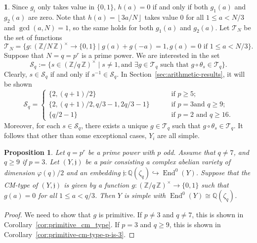 \documentclass{amsart}[11pt]
\newtheorem{prop}[thm]{Proposition}
\theoremstyle{definition}
\newtheorem{sect}[thm]{}
\numberwithin{equation}{section}
\theoremstyle{notitle}
\begin{document}
  \begin{sect}\label{subsec:notation-arithmetic-result-on-cm-type}
    Since $g_i$ only takes value in $\{0,1\}$, $h(a)=0$ if and only if
    both $g_1(a)$ and $g_2(a)$ are zero. Note that $h(a)={\left\lfloor {3a/N} \right\rfloor}$
    takes value 0 for all $1\leq a< N/3$ and $\gcd(a,N)=1$, so the
    same holds for both $g_1(a)$ and $g_2(a)$.  Let ${\mathscr{T}}_N$ be the set
    of functions
  \begin{equation}
    \label{eq:35}
    {\mathscr{T}}_N=\{g: {(\mathbb{Z}/ {N}\, \mathbb{Z})^\times}\to \{0, 1\}\mid g(a)+g(-a)=1,  g(a)=0 \text{ if }
    1\leq a <N/3\}.
  \end{equation}
  Suppose that $N=q=p^r$ is a prime power. We are interested in the
  set 
  \begin{equation}
    \label{eq:37}
 {\mathscr{S}}_q:=\{s\in {(\mathbb{Z}/ {q}\, \mathbb{Z})^\times} \mid s\neq 1, \text{and } \exists g\in
  {\mathscr{T}}_q \text{ such that } g\circ \theta_s\in {\mathscr{T}}_q\}.     
  \end{equation}
Clearly, $s\in {\mathscr{S}}_q$ if and only if $s^{-1}\in {\mathscr{S}}_q$. 
  In Section~\ref{sec:arithmetic-results}, it will be shown
  \begin{equation}
    \label{eq:36}
    {\mathscr{S}}_q=
    \begin{cases}
      \{2, (q+1)/2\}  \qquad & \text{ if } p \geq 5;\\
      \{2, (q+1)/2, q/3-1, 2q/3-1\} \qquad & \text{ if } p=3 \text{
        and } q\geq 9;\\
      \{q/2-1\} \qquad & \text{ if } p=2 \text{ and } q\geq 16. 
    \end{cases}
  \end{equation}
  Moreover, for each $s\in {\mathscr{S}}_q$, there exists a unique $g\in {\mathscr{T}}_q$
  such that $g\circ \theta_s\in {\mathscr{T}}_q$. It follows that other than
  some exceptional cases, $Y_i$ are all simple. 
  \end{sect}

\begin{prop}\label{prop:simple-cm-by-cyclotomic}
  Let $q=p^r$ be a prime power with $p$ odd. Assume that $q\neq 7$,
  and $q\geq 9$ if $p=3$. Let $(Y,{\mathfrak{j}})$ be a pair consisting a complex
  abelian variety of dimension $\varphi(q)/2$ and an embedding ${\mathfrak{j}}:
  {\mathbb{Q}}(\zeta_q)\hookrightarrow \operatorname{End}^0(Y)$. Suppose that the CM-type of
  $(Y, {\mathfrak{j}})$ is given by a function $g: {(\mathbb{Z}/ {q}\, \mathbb{Z})^\times}\to \{0, 1\}$ such
  that $g(a)=0 $ for all $1\leq a < q/3$.  Then $Y$ is simple with
  $\operatorname{End}^0(Y)\cong{\mathbb{Q}}(\zeta_q)$.
\end{prop}
\begin{proof}
  We need to show that $g$ is primitive. If $p\neq 3$ and
  $q\neq 7$, this is shown in
  Corollary~\ref{cor:primitive_cm_type}. If $p=3$ and $q\geq 9$, this
  is shown in Corollary~\ref{cor:primitive-cm-type-p-is-3}.
\end{proof}
\end{document}
